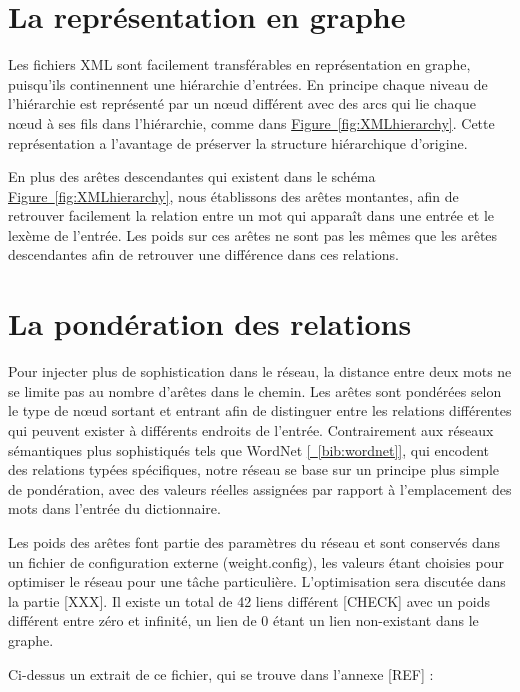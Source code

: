 \documentclass[a4paper, 12pt]{article}
\begin{document}
\section{La représentation en graphe}

Les fichiers XML sont facilement transférables en représentation en graphe, 
puisqu'ils continennent une hiérarchie d'entrées. En principe chaque niveau de 
l'hiérarchie est représenté par un nœud différent avec des arcs qui lie chaque 
nœud à ses fils dans l'hiérarchie, comme dans 
\hyperref[fig:XMLhierarchy]{Figure~\ref*{fig:XMLhierarchy}}. Cette 
représentation a l'avantage de préserver la structure hiérarchique d'origine.

En plus des arêtes descendantes qui existent dans le schéma 
\hyperref[fig:XMLhierarchy]{Figure~\ref*{fig:XMLhierarchy}}, nous établissons 
des arêtes montantes, afin de retrouver facilement la relation entre un mot qui 
apparaît dans une entrée et le lexème de l'entrée. Les poids sur ces arêtes ne 
sont pas les mêmes que les arêtes descendantes afin de retrouver une différence 
dans ces relations.


\section{La pondération des relations}

Pour injecter plus de sophistication dans le réseau, la distance entre deux mots 
ne se limite pas au nombre d'arêtes dans le chemin. Les arêtes sont pondérées 
selon le type de nœud sortant et entrant afin de distinguer entre les relations 
différentes qui peuvent exister à différents endroits de l'entrée. Contrairement 
aux réseaux sémantiques plus sophistiqués tels que WordNet 
\hyperref[bib:wordnet]{[~\ref*{bib:wordnet}]}, qui encodent des relations typées 
spécifiques, notre réseau se base sur un principe plus simple de pondération, 
avec des valeurs réelles assignées par rapport à l'emplacement des mots dans 
l'entrée du dictionnaire.

Les poids des arêtes font partie des paramètres du réseau et sont conservés 
dans un fichier de configuration externe (weight.config), les valeurs étant 
choisies pour optimiser le réseau pour une tâche particulière. L'optimisation 
sera discutée dans la partie [XXX]. Il existe un total de 42 liens différent 
[CHECK] avec un poids différent entre zéro et infinité, un lien de 0 étant un 
lien non-existant dans le graphe.

Ci-dessus un extrait de ce fichier, qui se trouve dans l'annexe [REF] :
\end{document}
